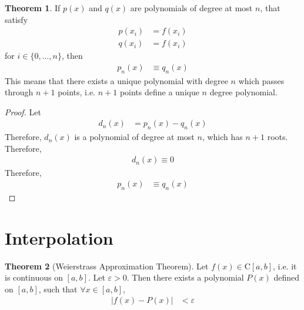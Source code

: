 \documentclass[fleqn, a4paper, 12pt, twoside]{article}
\theoremstyle{definition}
\theoremstyle{theorem}
\newtheorem{theorem}{Theorem}
\begin{document}
\begin{theorem}
	If $p(x)$ and $q(x)$ are polynomials of degree at most $n$, that satisfy
	\begin{align*}
		p(x_i) &= f(x_i)\\
		q(x_i) &= f(x_i)
	\end{align*}
	for $i \in \{0,\dots,n\}$, then
	\begin{align*}
		p_n(x) &\equiv q_n(x)
	\end{align*}
	This means that there exists a unique polynomial with degree $n$ which passes through $n + 1$ points, i.e. $n + 1$ points define a unique $n$ degree polynomial.
\end{theorem}

\begin{proof}
	Let
	\begin{align*}
		d_n(x) &= p_n(x) - q_n(x)
	\end{align*}
	Therefore, $d_n(x)$ is a polynomial of degree at most $n$, which has $n + 1$ roots.
	Therefore,
	\begin{align*}
		d_n(x) \equiv 0
	\end{align*}
	Therefore,
	\begin{align*}
		p_n(x) &\equiv q_n(x)
	\end{align*}
\end{proof}

\section{Interpolation}

\begin{theorem}[Weierstrass Approximation Theorem]
	Let $f(x) \in \mathrm{C} [a,b]$, i.e. it is continuous on $[a,b]$.
	Let $\varepsilon > 0$.
	Then there exists a polynomial $P(x)$ defined on $[a,b]$, such that $\forall x \in [a,b]$,
	\begin{align*}
		\left| f(x) - P(x) \right| &< \varepsilon
	\end{align*}
	\label{Weierstrass_Approximation_Theorem}
\end{theorem}
\end{document}
